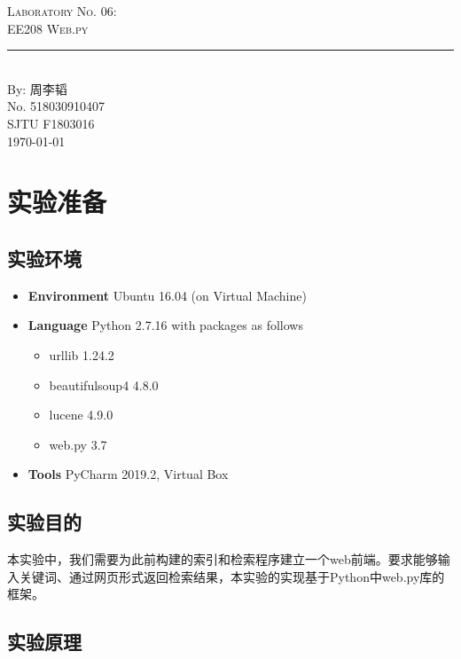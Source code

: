 \documentclass{article}
\newcommand{\labno}{06}
\newcommand{\labtitle}{EE208 Web.py}
\newcommand{\authorname}{周李韬}
\newcommand{\studentno}{518030910407}
\newcommand{\classno}{F1803016}
\begin{document}
\begin{center}
{\LARGE \textsc{Laboratory No. \labno:} \\ \vspace{4pt}}
{\Large \textsc{\labtitle} \\ \vspace{4pt}} 
\rule[13pt]{\textwidth}{1pt} \\ \vspace{15pt}
{\large By: \authorname \\ \vspace{10pt}
No. \studentno \\ \vspace{10pt}
SJTU \classno \\ \vspace{10pt}
\today \vspace{20pt}}
\end{center}



\section{实验准备}

\subsection{实验环境}
\begin{itemize}
\item\textbf{Environment} Ubuntu 16.04 (on Virtual Machine)
\item\textbf{Language} Python 2.7.16 with packages as follows
	\begin{itemize}
	\item urllib 1.24.2
	\item beautifulsoup4 4.8.0
	\item lucene 4.9.0
	\item web.py 3.7
	\end{itemize}
\item\textbf{Tools} PyCharm 2019.2, Virtual Box
\end{itemize}

\subsection{实验目的}
本实验中，我们需要为此前构建的索引和检索程序建立一个web前端。要求能够输入关键词、通过网页形式返回检索结果，本实验的实现基于Python中web.py库的框架。

\subsection{实验原理}
\end{document}
